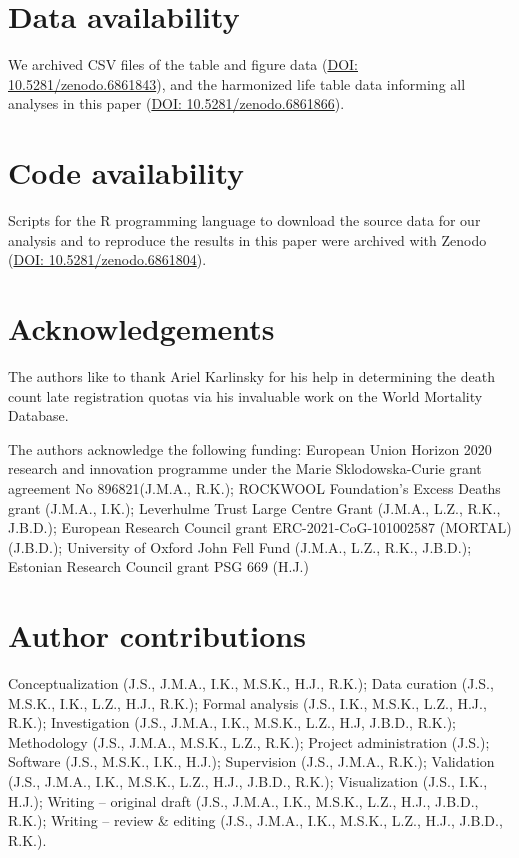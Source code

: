 \documentclass[12pt]{article}
\begin{document}
\clearpage

\section*{Data availability}

We archived CSV files of the table and figure data (\href{https://zenodo.org/record/6861843}{DOI: 10.5281/zenodo.6861843}), and the harmonized life table data informing all analyses in this paper (\href{https://zenodo.org/record/6861866}{DOI: 10.5281/zenodo.6861866}).

\section*{Code availability}

Scripts for the R programming language to download the source data for our analysis and to reproduce the results in this paper were archived with Zenodo (\href{https://zenodo.org/record/6861804}{DOI: 10.5281/zenodo.6861804}).

\section*{Acknowledgements}

The authors like to thank Ariel Karlinsky for his help in determining the death count late registration quotas via his invaluable work on the World Mortality Database.

The authors acknowledge the following funding: European Union Horizon 2020 research and innovation programme under the Marie Sklodowska-Curie grant agreement No 896821(J.M.A., R.K.); ROCKWOOL Foundation's Excess Deaths grant (J.M.A., I.K.); Leverhulme Trust Large Centre Grant (J.M.A., L.Z., R.K., J.B.D.); European Research Council grant ERC-2021-CoG-101002587 (MORTAL) (J.B.D.); University of Oxford John Fell Fund (J.M.A., L.Z., R.K., J.B.D.); Estonian Research Council grant PSG 669 (H.J.)

\section*{Author contributions}

Conceptualization (J.S., J.M.A., I.K., M.S.K., H.J., R.K.); Data curation (J.S., M.S.K., I.K., L.Z., H.J., R.K.); Formal analysis (J.S., I.K., M.S.K., L.Z., H.J., R.K.); Investigation (J.S., J.M.A., I.K., M.S.K., L.Z., H.J, J.B.D., R.K.); Methodology (J.S., J.M.A., M.S.K., L.Z., R.K.); Project administration (J.S.); Software (J.S., M.S.K., I.K., H.J.); Supervision (J.S., J.M.A., R.K.); Validation (J.S., J.M.A., I.K., M.S.K., L.Z., H.J., J.B.D., R.K.); Visualization (J.S., I.K., H.J.); Writing -- original draft (J.S., J.M.A., I.K., M.S.K., L.Z., H.J., J.B.D., R.K.); Writing -- review  \& editing (J.S., J.M.A., I.K., M.S.K., L.Z., H.J., J.B.D., R.K.).
\end{document}
